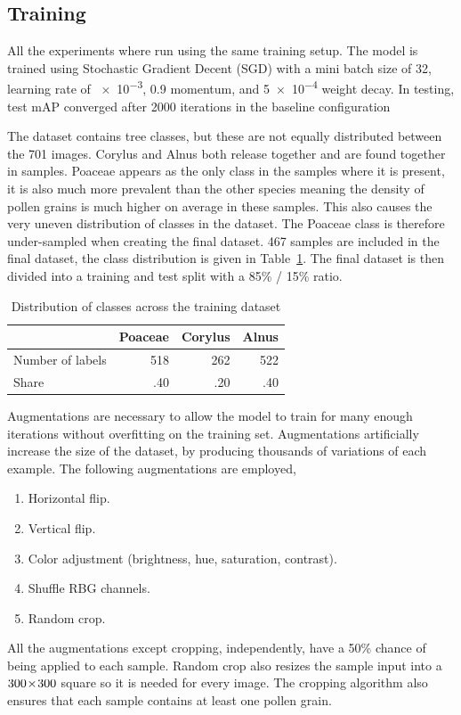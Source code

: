 \subsection{Training}
All the experiments where run using the same training setup.
The model is trained using Stochastic Gradient Decent (SGD) with a mini batch size of 32, learning rate of \num{e-3}, \num{0.9} momentum, and \num{5e-4} weight decay.
In testing, test mAP converged after 2000 iterations in the baseline configuration

The dataset contains tree classes, but these are not equally distributed between the 701 images.
Corylus and Alnus both release together and are found together in samples.
Poaceae appears as the only class in the samples where it is present, it is also much more prevalent than the other species meaning the density of pollen grains is much higher on average in these samples.
This also causes the very uneven distribution of classes in the dataset.
The Poaceae class is therefore under-sampled when creating the final dataset.
467 samples are included in the final dataset, the class distribution is given in Table~\ref{tab:training-dataset}.
The final dataset is then divided into a training and test split with a 85\% / 15\% ratio.

\begin{table}[htbp]
  \caption[Class distribution across the final training dataset containing 467 sample images.]{Distribution of classes across the training dataset}\label{tab:training-dataset}
  \centering
  \begin{tabular}{lrrr} \toprule
                      & Poaceae & Corylus & Alnus \\ \midrule
    Number of labels  & 518    & 262     & 522 \\
    Share             & .40  & .20  & .40 \\ \bottomrule
  \end{tabular}
\end{table}

Augmentations are necessary to allow the model to train for many enough iterations without overfitting on the training set.
Augmentations artificially increase the size of the dataset, by producing thousands of variations of each example.
The following augmentations are employed,
%
\begin{enumerate}
  \item Horizontal flip.
  \item Vertical flip.
  \item Color adjustment (brightness, hue, saturation, contrast).
  \item Shuffle RBG channels.
  \item Random crop.
\end{enumerate}
%
All the augmentations except cropping, independently, have a 50\% chance of being applied to each sample.
Random crop also resizes the sample input into a \(300\!\times \! 300\) square so it is needed for every image.
The cropping algorithm also ensures that each sample contains at least one pollen grain.

